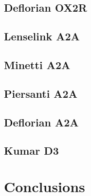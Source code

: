 \lipsum[1][1-3]

\subsection{Deflorian OX2R}

\lipsum[1][1-3]

\subsection{Lenselink A2A}

\lipsum[1][1-3]

\subsection{Minetti A2A}

\lipsum[1][1-3]

\subsection{Piersanti A2A}

\lipsum[1][1-3]

\subsection{Deflorian A2A}

\lipsum[1][1-3]

\subsection{Kumar D3}

\lipsum[1][1-3]

\section{Conclusions}
\lipsum[1][1-3]
